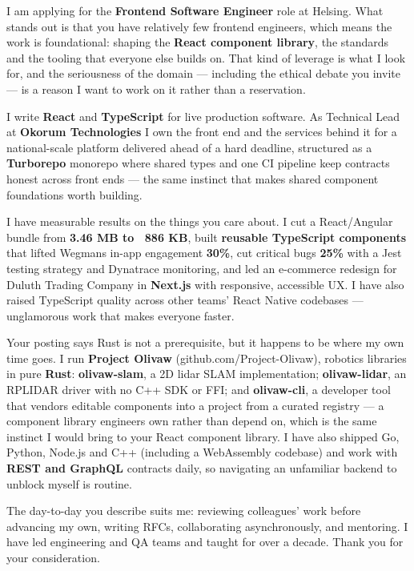 \documentclass[11pt,a4paper]{awesome-cv}
\begin{document}
\makecvheader[R]
\makelettertitle

\begin{cvletter}

I am applying for the \textbf{Frontend Software Engineer} role at Helsing. What stands out is that you have relatively few frontend engineers, which means the work is foundational: shaping the \textbf{React component library}, the standards and the tooling that everyone else builds on. That kind of leverage is what I look for, and the seriousness of the domain --- including the ethical debate you invite --- is a reason I want to work on it rather than a reservation.

I write \textbf{React} and \textbf{TypeScript} for live production software. As Technical Lead at \textbf{Okorum Technologies} I own the front end and the services behind it for a national-scale platform delivered ahead of a hard deadline, structured as a \textbf{Turborepo} monorepo where shared types and one CI pipeline keep contracts honest across front ends --- the same instinct that makes shared component foundations worth building.

I have measurable results on the things you care about. I cut a React/Angular bundle from \textbf{3.46 MB to ~886 KB}, built \textbf{reusable TypeScript components} that lifted Wegmans in-app engagement \textbf{30\%}, cut critical bugs \textbf{25\%} with a Jest testing strategy and Dynatrace monitoring, and led an e-commerce redesign for Duluth Trading Company in \textbf{Next.js} with responsive, accessible UX. I have also raised TypeScript quality across other teams' React Native codebases --- unglamorous work that makes everyone faster.

Your posting says Rust is not a prerequisite, but it happens to be where my own time goes. I run \textbf{Project Olivaw} (github.com/Project-Olivaw), robotics libraries in pure \textbf{Rust}: \textbf{olivaw-slam}, a 2D lidar SLAM implementation; \textbf{olivaw-lidar}, an RPLIDAR driver with no C++ SDK or FFI; and \textbf{olivaw-cli}, a developer tool that vendors editable components into a project from a curated registry --- a component library engineers own rather than depend on, which is the same instinct I would bring to your React component library. I have also shipped Go, Python, Node.js and C++ (including a WebAssembly codebase) and work with \textbf{REST and GraphQL} contracts daily, so navigating an unfamiliar backend to unblock myself is routine.

The day-to-day you describe suits me: reviewing colleagues' work before advancing my own, writing RFCs, collaborating asynchronously, and mentoring. I have led engineering and QA teams and taught for over a decade. Thank you for your consideration.

\end{cvletter}

\makeletterclosing
\end{document}
